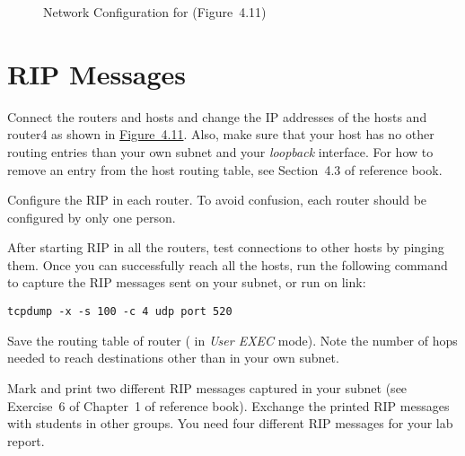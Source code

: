 \documentclass{../UTNetLab}
\begin{document}
\begin{figure}[H]
    \caption{Network Configuration for  (Figure~4.11)}\label{fig:4.11}
\end{figure}
\section{RIP Messages}
Connect the routers and hosts and change the IP addresses of the hosts and router4 as shown in \hyperref[fig:4.11]{Figure~4.11}.
Also, make sure that your host has no other routing entries than your own subnet and your \textit{loopback} interface.
For how to remove an entry from the host routing table, see Section~4.3 of reference book.

Configure the RIP in each router.
To avoid confusion, each router should be configured by only one person.

After starting RIP in all the routers, test connections to other hosts by pinging them.
Once you can successfully reach all the hosts, run the following command to capture the RIP messages sent on your subnet, or run  on link:
\begin{lstlisting}[morekeywords={[3]udp,port}]
tcpdump -x -s 100 -c 4 udp port 520
    \end{lstlisting}

Save the routing table of router ( in \textit{User EXEC} mode).
Note the number of hops needed to reach destinations other than in your own subnet.

Mark and print two different RIP messages captured in your subnet (see Exercise~6 of Chapter~1 of reference book).
Exchange the printed RIP messages with students in other groups.
You need four different RIP messages for your lab report.
\end{document}
